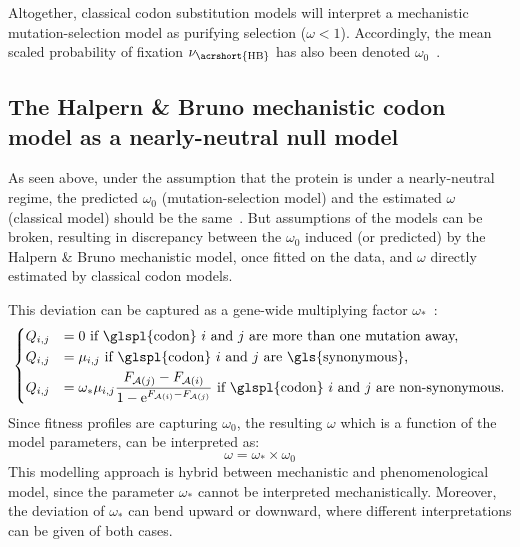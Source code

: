 Altogether, classical \gls{codon} \gls{substitution} models will interpret a mechanistic mutation-selection model as purifying selection ($\omega < 1$).
Accordingly, the mean scaled probability of fixation $\avgpfix_{\text{\acrshort{HB}}}$ has also been denoted $\omega_0$~\citep{Rodrigue2016}.

\subsection{The Halpern \& Bruno mechanistic codon model as a nearly-neutral null model}
\label{subsec:HB-formalism-nearly-neutral-null-model}

As seen above, under the assumption that the protein is under a \gls{nearly-neutral} regime, the predicted $\omega_0$ (mutation-selection model) and the estimated $\omega$ (classical model) should be the same~\citep{Spielman2015}.
But assumptions of the models can be broken, resulting in discrepancy between the $\omega_0$ induced (or predicted) by the Halpern \& Bruno mechanistic model, once fitted on the data, and $\omega$ directly estimated by classical \gls{codon} models.

This deviation can be captured as a gene-wide multiplying factor $\omega_*$~\citep{Rodrigue2016}:
\begin{equation}
    \begin{dcases}
        \submatrix_{\itoj} & = 0 \text{ if \glspl{codon} $\ci$ and $\cj$ are more than one mutation away,} \\
        \submatrix_{\itoj} & = \mu_{\itoj} \text{ if \glspl{codon} $\ci$ and $\cj$ are \gls{synonymous},} \\
        \submatrix_{\itoj} & = \omega_* \mu_{\itoj} \dfrac{\Fitj - \Fiti}{1 - \e^{\Fiti - \Fitj} } \text{ if \glspl{codon} $\ci$ and $\cj$ are non-synonymous}.
    \end{dcases}
    \label{eq:propensities-models-omegastar}
\end{equation}
Since fitness profiles are capturing $\omega_0$, the resulting $\omega$ which is a function of the model parameters, can be interpreted as:
\begin{equation}
    \omega = \omega_* \times \omega_0
\end{equation}
This modelling approach is hybrid between mechanistic and phenomenological model, since the parameter $\omega_*$ cannot be interpreted mechanistically.
Moreover, the deviation of $\omega_*$ can bend upward or downward, where different interpretations can be given of both cases.

